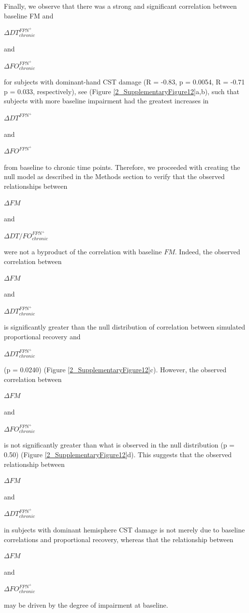 \documentclass[phd,tocprelim]{cornell}
\begin{document}
    Finally, we observe that there was a strong and significant correlation between baseline FM and \begin{Large}$\Delta DT^{FPN^+}_{chronic}$\end{Large} and \begin{Large}$\Delta FO^{FPN^+}_{chronic}$\end{Large} for subjects with dominant-hand CST damage (R = -0.83, p = 0.0054, R = -0.71 p = 0.033, respectively), see (Figure \ref{2_SupplementaryFigure12}a,b), such that subjects with more baseline impairment had the greatest increases in \begin{Large}$\Delta DT^{FPN^+}$\end{Large} and \begin{Large}$\Delta FO^{FPN^+}$\end{Large} from baseline to chronic time points. Therefore, we proceeded with creating the null model as described in the Methods section to verify that the observed relationships between \begin{Large}$\Delta FM$\end{Large} and \begin{Large}$\Delta DT/FO^{FPN^+}_{chronic}$\end{Large} were not a byproduct of the correlation with baseline $FM$. Indeed, the observed correlation between \begin{Large}$\Delta FM$\end{Large} and \begin{Large}$\Delta DT^{FPN^+}_{chronic}$\end{Large} is significantly greater than the null distribution of correlation between simulated proportional recovery and \begin{Large}$\Delta DT^{FPN^+}_{chronic}$\end{Large} (p = 0.0240) (Figure \ref{2_SupplementaryFigure12}c). However, the observed correlation between \begin{Large}$\Delta FM$\end{Large} and \begin{Large}$\Delta FO^{FPN^+}_{chronic}$\end{Large} is not significantly greater than what is observed in the null distribution (p = 0.50) (Figure \ref{2_SupplementaryFigure12}d). This suggests that the observed relationship between \begin{Large}$\Delta FM$\end{Large} and \begin{Large}$\Delta DT^{FPN^+}_{chronic}$\end{Large} in subjects with dominant hemisphere CST damage is not merely due to baseline correlations and proportional recovery, whereas that the relationship between \begin{Large}$\Delta FM$\end{Large} and \begin{Large}$\Delta FO^{FPN^+}_{chronic}$\end{Large} may be driven by the degree of impairment at baseline. 
\end{document}

